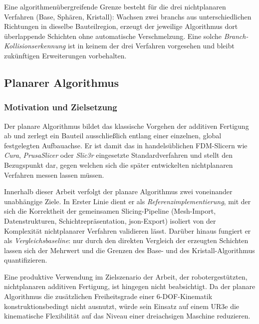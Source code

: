         Eine algorithmenübergreifende Grenze besteht für die drei nichtplanaren Verfahren (Base, Sphären, Kristall):
        Wachsen zwei \glspl{branch} aus unterschiedlichen Richtungen in dieselbe Bauteilregion, erzeugt der jeweilige Algorithmus dort überlappende Schichten ohne automatische Verschmelzung.
        Eine solche \emph{Branch-Kollisionserkennung} ist in keinem der drei Verfahren vorgesehen und bleibt zukünftigen Erweiterungen vorbehalten.

        \subsection{Planarer Algorithmus}\label{subsec:concept-planar-algorithm} 
            \subsubsection{Motivation und Zielsetzung}\label{subsubsec:concept-planar-motivation}
                Der planare Algorithmus bildet das klassische Vorgehen der additiven Fertigung ab und zerlegt ein Bauteil ausschließlich entlang einer einzelnen, global festgelegten Aufbauachse.
                Er ist damit das in handelsüblichen \ac{FDM}-Slicern wie \emph{Cura}, \emph{PrusaSlicer} oder \emph{Slic3r} eingesetzte Standardverfahren und stellt den Bezugspunkt dar, gegen welchen sich die später entwickelten nichtplanaren Verfahren messen lassen müssen.

                Innerhalb dieser Arbeit verfolgt der planare Algorithmus zwei voneinander unabhängige Ziele.
                In Erster Linie dient er als \emph{Referenzimplementierung}, mit der sich die Korrektheit der gemeinsamen Slicing-Pipeline (Mesh-Import, Datenstrukturen, Schichtrepräsentation, \gls{json}-Export) isoliert von der Komplexität nichtplanarer Verfahren validieren lässt.
                Darüber hinaus fungiert er als \emph{Vergleichsbaseline}: nur durch den direkten Vergleich der erzeugten Schichten lassen sich der Mehrwert und die Grenzen des Base- und des Kristall-Algorithmus quantifizieren.

                Eine produktive Verwendung im Zielszenario der Arbeit, der robotergestützten, nichtplanaren additiven Fertigung, ist hingegen nicht beabsichtigt.
                Da der planare Algorithmus die zusätzlichen Freiheitsgrade einer 6-\ac{DOF}-Kinematik konstruktionsbedingt nicht ausnutzt, würde sein Einsatz auf einem UR3e die kinematische Flexibilität auf das Niveau einer dreiachsigen Maschine reduzieren.

